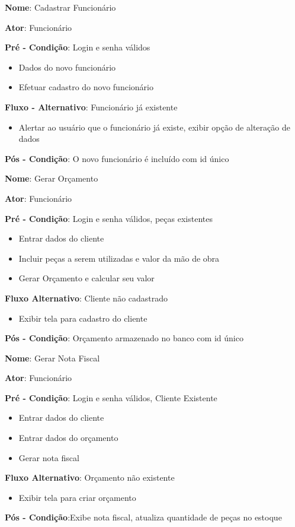 \documentclass[a4paper,10pt]{article}
\begin{document}
\begin{framed}
\textbf{Nome}: Cadastrar Funcionário

\textbf{Ator}: Funcionário

\textbf{Pré - Condição}: Login e senha válidos
\begin{itemize}
\item Dados do novo funcionário
\item Efetuar cadastro do novo funcionário
\end{itemize}
\textbf{Fluxo - Alternativo}: Funcionário já existente 
\begin{itemize}
\item Alertar ao usuário que o funcionário já existe, exibir opção de alteração de dados 
\end{itemize}
\textbf{Pós - Condição}: O novo funcionário é incluído com id único
\end{framed}

\begin{framed}
\textbf{Nome}: Gerar Orçamento

\textbf{Ator}: Funcionário

\textbf{Pré - Condição}: Login e senha válidos, peças existentes
\begin{itemize}
\item Entrar dados do cliente
\item Incluir peças a serem utilizadas e valor da mão de obra
\item Gerar Orçamento e calcular seu valor
\end{itemize}
\textbf{Fluxo Alternativo}: Cliente não cadastrado
\begin{itemize}
\item Exibir tela para cadastro do cliente
\end{itemize}
\textbf{Pós - Condição}: Orçamento armazenado no banco com id único
\end{framed}

\begin{framed}
\textbf{Nome}: Gerar Nota Fiscal

\textbf{Ator}: Funcionário

\textbf{Pré - Condição}: Login e senha válidos, Cliente Existente
\begin{itemize}
\item Entrar dados do cliente
\item Entrar dados do orçamento
\item Gerar nota fiscal
\end{itemize}
\textbf{Fluxo Alternativo}: Orçamento não existente
\begin{itemize}
\item Exibir tela para criar orçamento
\end{itemize}
\textbf{Pós - Condição}:Exibe nota fiscal,  atualiza quantidade de peças no estoque
\end{framed}
\end{document}
